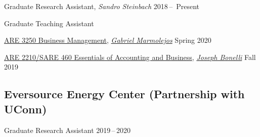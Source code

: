 \documentclass[11 pt,letterpaper]{article}
\renewenvironment{itemize}{
	\begin{list}{}{
			\setlength{\leftmargin}{1.5em}
		}
	}{
	\end{list}
}
\begin{document}
	\begin{itemize}
		\item[-] Graduate Research Assistant,    \textit{Sandro Steinbach} 	\hfill    2018\,--\, Present
		
	 
		 	
	 
 
		
 
	
				 
		
		\item[-] Graduate  Teaching Assistant
		
		\href{https://catalog.uconn.edu/directory-of-courses/course/}{ARE 3250 Business Management},
		\href{https://are.uconn.edu/person/gabriel-marmolejos/}{\textit{Gabriel Marmolejos}}
		\hfill   Spring 2020
		
		\href{https://catalog.uconn.edu/directory-of-courses/course/}{ARE 2210/SARE 460 Essentials of Accounting and Business},
		\href{https://cahnr.uconn.edu/person/joseph-bonelli/}{\textit{Joseph Bonelli}}
		\hfill   Fall 2019
	\end{itemize}
	
	
	\subsection*{Eversource Energy Center  (Partnership with UConn) }
	
	\begin{itemize}
		\item[-] Graduate Research Assistant      \hfill 2019\,--\,2020
		
	\end{itemize}
	
\end{document}

